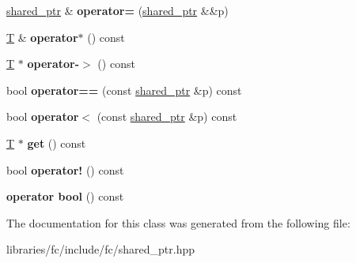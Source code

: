 \begin{DoxyCompactItemize}
\mbox{\hyperlink{classfc_1_1shared__ptr}{shared\+\_\+ptr}} \& {\bfseries operator=} (\mbox{\hyperlink{classfc_1_1shared__ptr}{shared\+\_\+ptr}} \&\&p)
\item 
\mbox{\label{classfc_1_1shared__ptr_a195ec76bd081b7610add20837d2a462c}} 
\mbox{\hyperlink{struct_t}{T}} \& {\bfseries operator$\ast$} () const
\item 
\mbox{\label{classfc_1_1shared__ptr_a18414b8538fc243818fa49f13f0d6397}} 
\mbox{\hyperlink{struct_t}{T}} $\ast$ {\bfseries operator-\/$>$} () const
\item 
\mbox{\label{classfc_1_1shared__ptr_a600f677055900c7513493331726754d8}} 
bool {\bfseries operator==} (const \mbox{\hyperlink{classfc_1_1shared__ptr}{shared\+\_\+ptr}} \&p) const
\item 
\mbox{\label{classfc_1_1shared__ptr_a7c6ba2b78eae287ebc50425c7b934f15}} 
bool {\bfseries operator$<$} (const \mbox{\hyperlink{classfc_1_1shared__ptr}{shared\+\_\+ptr}} \&p) const
\item 
\mbox{\label{classfc_1_1shared__ptr_ac0d5ade8f130d16e3fe46ab93b2559ee}} 
\mbox{\hyperlink{struct_t}{T}} $\ast$ {\bfseries get} () const
\item 
\mbox{\label{classfc_1_1shared__ptr_aaba493120e5eb9f260da7f6b2b734616}} 
bool {\bfseries operator!} () const
\item 
\mbox{\label{classfc_1_1shared__ptr_a456595383535051379a3d3b63f2a57d8}} 
{\bfseries operator bool} () const
\end{DoxyCompactItemize}


The documentation for this class was generated from the following file\+:\begin{DoxyCompactItemize}
\item 
libraries/fc/include/fc/shared\+\_\+ptr.\+hpp\end{DoxyCompactItemize}
